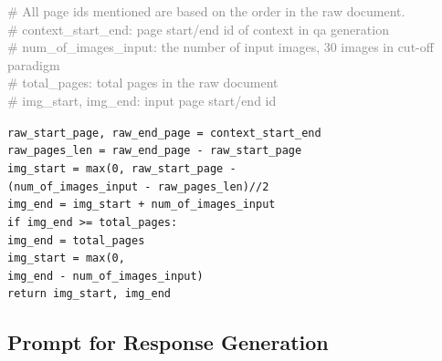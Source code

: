 \begin{tcolorbox}[colback=gray!5,left=0.8mm,right=0.8mm]
\small
\textcolor{gray}{\# All page ids mentioned are based on the order in the raw document.} \\
\textcolor{gray}{\# context\_start\_end: page start/end id of context in qa generation} \\
\textcolor{gray}{\# num\_of\_images\_input: the number of input images, 30 images in cut-off paradigm} \\
\textcolor{gray}{\# total\_pages: total pages in the raw document} \\
\textcolor{gray}{\# img\_start, img\_end: input page start/end id} \\
\raggedright
\texttt{raw\_start\_page, raw\_end\_page = context\_start\_end} \\

\texttt{raw\_pages\_len = raw\_end\_page - raw\_start\_page} \\

\texttt{img\_start = max(0, raw\_start\_page -}  \\
\texttt{\quad \quad (num\_of\_images\_input - raw\_pages\_len)//2} \\

\texttt{img\_end = img\_start + num\_of\_images\_input} \\

\texttt{if img\_end >= total\_pages:} \\

\texttt{\quad \quad img\_end = total\_pages} \\

\texttt{\quad \quad img\_start = max(0, } \\
\texttt{\quad \quad img\_end - num\_of\_images\_input)} \\

\texttt{return img\_start, img\_end}
        
\label{text:selection_rules}
\end{tcolorbox}


\subsection{Prompt for Response Generation}
\label{xsubsec:prompt_of_response_generation}

% 

